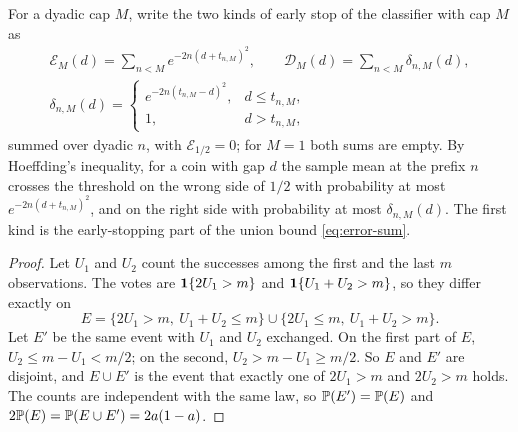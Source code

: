 For a dyadic cap $M$, write the two kinds of early stop of the
classifier with cap $M$ as
\begin{gather*}
 \mathcal E_M(d)=\sum_{n<M}e^{-2n(d+t_{n,M})^2},\qquad
 \mathcal D_M(d)=\sum_{n<M}\delta_{n,M}(d),\\
 \delta_{n,M}(d)=\begin{cases}e^{-2n(t_{n,M}-d)^2},&d\le t_{n,M},\\
 1,&d>t_{n,M},\end{cases}
\end{gather*}
summed over dyadic $n$, with $\mathcal E_{1/2}=0$; for $M=1$ both sums are
empty. By Hoeffding's inequality, for a coin with gap $d$ the sample mean
at the prefix $n$ crosses the threshold on the wrong side of $1/2$ with
probability at most $e^{-2n(d+t_{n,M})^2}$, and on the right side with
probability at most $\delta_{n,M}(d)$. The first kind is the
early-stopping part of the union bound \eqref{eq:error-sum}.


\begin{proof}
Let $U_1$ and $U_2$ count the successes among the first and the last $m$
observations. The votes are $\mathbf 1\{2U_1>m\}$ and $\mathbf 1\{U_1+U_2>m\}$, so
they differ exactly on
\[
 E=\{2U_1>m,\ U_1+U_2\le m\}\cup\{2U_1\le m,\ U_1+U_2>m\}.
\]
Let $E'$ be the same event with $U_1$ and $U_2$ exchanged. On the first
part of $E$, $U_2\le m-U_1<m/2$; on the second, $U_2>m-U_1\ge m/2$. So $E$
and $E'$ are disjoint, and $E\cup E'$ is the event that exactly one of
$2U_1>m$ and $2U_2>m$ holds. The counts are independent with the same law,
so $\mathbb P(E')=\mathbb P(E)$ and $2\mathbb P(E)=\mathbb P(E\cup E')=2a(1-a)$.
\end{proof}


